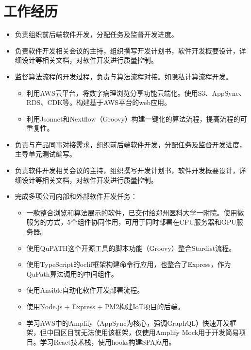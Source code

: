 \documentclass{resume}
\begin{document}

\section{工作经历}
\begin{itemize}
  \item 负责组织前后端软件开发，分配任务及监督开发进度。
  \item 负责软件开发相关会议的主持，组织撰写开发计划书，软件开发概要设计，详细设计等相关文档，对软件开发进行质量控制。
  \item 监督算法流程的开发过程，负责与算法流程对接。如隐私计算流程开发。
    \begin{itemize}
    \item 利用AWS云平台，将数字病理浏览分享功能云端化。使用S3、AppSync、RDS、CDK等。构建基于AWS平台的web应用。
    \item 利用Jsonnet和Nextflow（Groovy）构建一键化的算法流程，提高流程的可重复性。
    \end{itemize}
\end{itemize}

\begin{itemize}
  \item 负责与产品同事对接需求，组织前后端软件开发，分配任务及监督开发进度，主导单元测试编写。
  \item 负责软件开发相关会议的主持，组织撰写开发计划书，软件开发概要设计，详细设计等相关文档，对软件开发进行质量控制。
  \item 完成多项公司内部和外部软件开发任务：
    \begin{itemize}
    \item 一款整合浏览和算法展示的软件，已交付给郑州医科大学一附院。使用微服务的方式，5个组件协同作用，可用于同时部署在CPU服务器和GPU服务器。
    \item 使用QuPATH这个开源工具的脚本功能（Groovy）整合Stardist流程。
    \item 使用TypeScript的oclif框架构建命令行应用，也整合了Express，作为QuPath算法调用的中间组件。
    \item 使用Ansible自动化软件开发部署流程。
    \item 使用Node.js + Express + PM2构建IoT项目的后端。
    \item 学习AWS中的Amplify（AppSync为核心，强调GraphQL）快速开发框架，但中国区目前无法使用该框架，仅使用Amplify Mock用于开发简易项目。学习React技术栈，使用hooks构建SPA应用。
    \end{itemize}
\end{itemize}
\end{document}
